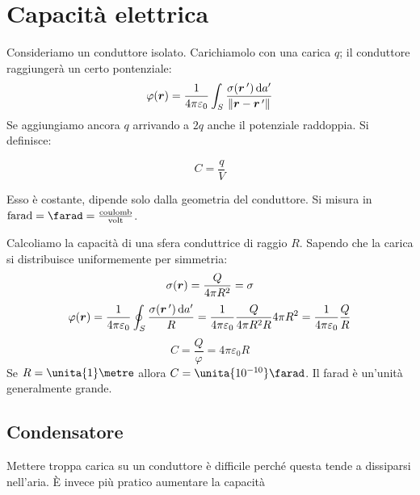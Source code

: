 \section{Capacità elettrica}
Consideriamo un conduttore isolato. Carichiamolo con una carica $q$; il conduttore raggiungerà un certo pontenziale:
\begin{equation*}\varphi(\boldsymbol{r})=\frac{1}{4\pi\varepsilon_0}\int_S\frac{\sigma(\boldsymbol{r}\,')\,\mathrm{d} a'}{\left\lVert\boldsymbol{r}-\boldsymbol{r}\,'\right\rVert}\end{equation*}
Se aggiungiamo ancora $q$ arrivando a $2q$ anche il potenziale raddoppia. Si definisce:
\begin{Def}
\begin{equation}
C=\frac{q}{V}
\end{equation}
\end{Def}
Esso è costante, dipende solo dalla geometria del conduttore. Si misura in $\text{farad}=\farad=\frac{\text{coulomb}}{\text{volt}}$.
\begin{Es}[sfera]
Calcoliamo la capacità di una sfera conduttrice di raggio $R$. Sapendo che la carica si distribuisce uniformemente per simmetria:
\begin{equation*}\sigma(\boldsymbol{r})=\frac{Q}{4\pi R^2}=\sigma\end{equation*}
\begin{equation*}\varphi(\boldsymbol{r})=\frac{1}{4\pi\varepsilon_0}\oint_S\frac{\sigma(\boldsymbol{r}\,')\,\mathrm{d} a'}{R}=\frac{1}{4\pi\varepsilon_0}\frac{Q}{4\pi R^2 R}4\pi R^2=\frac{1}{4\pi\varepsilon_0}\frac{Q}{R}\end{equation*}
\begin{equation*}C=\frac{Q}{\varphi}=4\pi\varepsilon_0R\end{equation*}
Se $R=\unita{1}\metre$ allora $C=\unita{10^{-10}}\farad$. Il farad è un'unità generalmente grande.
\end{Es}
\subsection{Condensatore}
Mettere troppa carica su un conduttore è difficile perché questa tende a dissiparsi nell'aria. \`E invece più pratico aumentare la capacità 

